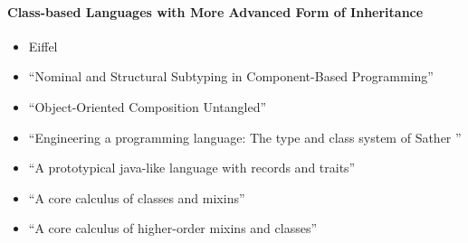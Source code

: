 \paragraph{Class-based Languages with More Advanced Form of Inheritance}


\begin{itemize}
\item Eiffel

\item ``Nominal and Structural Subtyping in Component-Based Programming''
\item ``Object-Oriented Composition Untangled''
\item ``Engineering a programming language: The type and class system of Sather ''

\item{``A prototypical java-like language with records and traits''}

\item ``A core calculus of classes and mixins''

\item ``A core calculus of higher-order mixins and classes''

\end{itemize}

